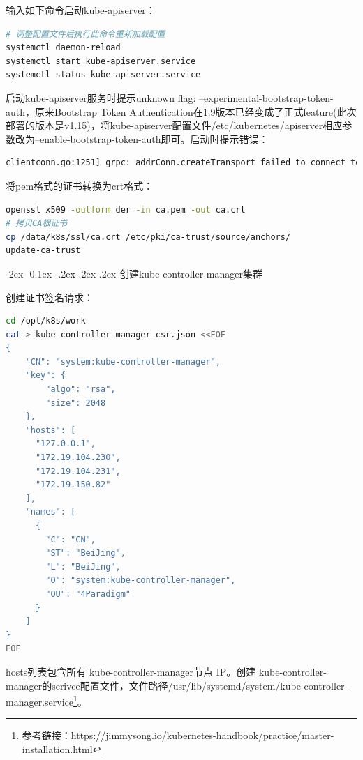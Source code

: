 \documentclass[8pt]{book}
\makeatletter
\numberwithin{dummy}{section}
\theoremstyle{ocrenumbox}
\theoremstyle{blacknumex}
\theoremstyle{blacknumbox}
\theoremstyle{ocrenum}
\renewcommand{\subsubsection}{\@startsection {subsubsection}{3}{\z@}
	{-2ex \@plus -0.1ex \@minus -.2ex}
	{.2ex \@plus.2ex }
	{\normalfont\small\sffamily\bfseries}}
\makeatother
\begin{document}
输入如下命令启动kube-apiserver：

\begin{lstlisting}[language=Bash]
# 调整配置文件后执行此命令重新加载配置
systemctl daemon-reload
systemctl start kube-apiserver.service
systemctl status kube-apiserver.service
\end{lstlisting}

启动kube-apiserver服务时提示unknown flag: --experimental-bootstrap-token-auth，原来Bootstrap Token Authentication在1.9版本已经变成了正式feature(此次部署的版本是v1.15)，将kube-apiserver配置文件/etc/kubernetes/apiserver相应参数改为--enable-bootstrap-token-auth即可。启动时提示错误：

\begin{lstlisting}[language=Bash]
clientconn.go:1251] grpc: addrConn.createTransport failed to connect to {172.19.150.82:2379 0  <nil>}. Err :connection error: desc = "transport: authentication handshake failed: x509: certificate signed by unknown authority (possibly because of \"crypto/rsa: verification error\" while trying to verify candidate authority certificate \"kubernetes\")". Reconnecting...
\end{lstlisting}

将pem格式的证书转换为crt格式：

\begin{lstlisting}[language=Bash]
openssl x509 -outform der -in ca.pem -out ca.crt
# 拷贝CA根证书
cp /data/k8s/ssl/ca.crt /etc/pki/ca-trust/source/anchors/
update-ca-trust
\end{lstlisting}

\subsubsection{创建kube-controller-manager集群}

创建证书签名请求：

\begin{lstlisting}[language=Bash]
cd /opt/k8s/work
cat > kube-controller-manager-csr.json <<EOF
{
    "CN": "system:kube-controller-manager",
    "key": {
        "algo": "rsa",
        "size": 2048
    },
    "hosts": [
      "127.0.0.1",
      "172.19.104.230",
      "172.19.104.231",
      "172.19.150.82"
    ],
    "names": [
      {
        "C": "CN",
        "ST": "BeiJing",
        "L": "BeiJing",
        "O": "system:kube-controller-manager",
        "OU": "4Paradigm"
      }
    ]
}
EOF
\end{lstlisting}

hosts列表包含所有 kube-controller-manager节点 IP。创建 kube-controller-manager的serivce配置文件，文件路径/usr/lib/systemd/system/kube-controller-manager.service\footnote{参考链接：\url{https://jimmysong.io/kubernetes-handbook/practice/master-installation.html}}。
\end{document}
